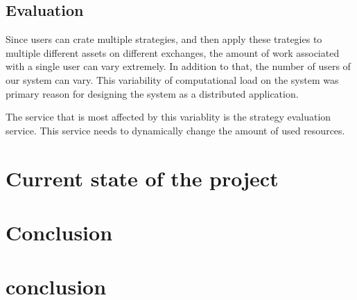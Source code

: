 \section{Evaluation}
Since users can crate multiple strategies, and then apply these trategies to multiple different assets on different exchanges,
the amount of work associated with a single user can vary extremely. In addition to that, the number of users of our system can vary.
This variability of computational load on the system was primary reason for designing the system as a distributed application.

The service that is most affected by this variablity is the strategy evaluation service. This service needs to
dynamically change the amount of used resources.



\chapter{Current state of the project}

\chapter{Conclusion}
\chapter{conclusion}




